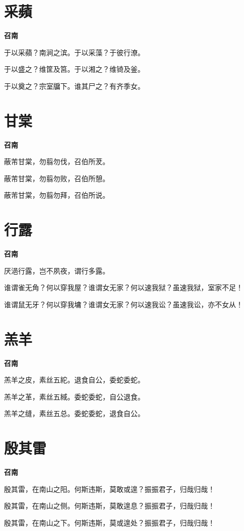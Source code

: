 \documentclass[12pt,a4paper]{ctexbook}
\begin{document}
\section{采蘋}
\textbf{召南}\par\vspace{0.5em}
于以采蘋？南涧之滨。于以采藻？于彼行潦。\par
于以盛之？维筐及筥。于以湘之？维锜及釜。\par
于以奠之？宗室牖下。谁其尸之？有齐季女。\par

\section{甘棠}
\textbf{召南}\par\vspace{0.5em}
蔽芾甘棠，勿翦勿伐，召伯所茇。\par
蔽芾甘棠，勿翦勿败，召伯所憩。\par
蔽芾甘棠，勿翦勿拜，召伯所说。\par

\section{行露}
\textbf{召南}\par\vspace{0.5em}
厌浥行露，岂不夙夜，谓行多露。\par
谁谓雀无角？何以穿我屋？谁谓女无家？何以速我狱？虽速我狱，室家不足！\par
谁谓鼠无牙？何以穿我墉？谁谓女无家？何以速我讼？虽速我讼，亦不女从！\par

\section{羔羊}
\textbf{召南}\par\vspace{0.5em}
羔羊之皮，素丝五紽。退食自公，委蛇委蛇。\par
羔羊之革，素丝五緎。委蛇委蛇，自公退食。\par
羔羊之缝，素丝五总。委蛇委蛇，退食自公。\par

\section{殷其雷}
\textbf{召南}\par\vspace{0.5em}
殷其雷，在南山之阳。何斯违斯，莫敢或遑？振振君子，归哉归哉！\par
殷其雷，在南山之侧。何斯违斯，莫敢遑息？振振君子，归哉归哉！\par
殷其雷，在南山之下。何斯违斯，莫或遑处？振振君子，归哉归哉！\par
\end{document}
